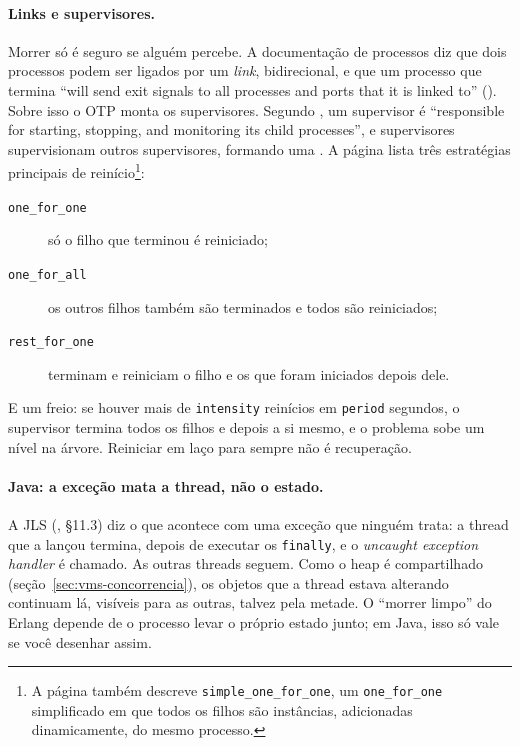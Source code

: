 \paragraph{Links e supervisores.}
Morrer só é seguro se alguém percebe. A documentação de processos diz que
dois processos podem ser ligados por um \emph{link}, bidirecional, e que
um processo que termina \enquote{will send exit signals to all processes
and ports that it is linked to} (). Sobre
isso o OTP monta os supervisores. Segundo ,
um supervisor é \enquote{responsible for starting, stopping, and
monitoring its child processes}, e supervisores supervisionam outros
supervisores, formando uma
. A página lista três
estratégias principais de reinício\footnote{A página também descreve
\texttt{simple\_one\_for\_one}, um \texttt{one\_for\_one} simplificado em
que todos os filhos são instâncias, adicionadas dinamicamente, do mesmo
processo.}:
\begin{description}
\item[\texttt{one\_for\_one}] só o filho que terminou é reiniciado;
\item[\texttt{one\_for\_all}] os outros filhos também são terminados e
  todos são reiniciados;
\item[\texttt{rest\_for\_one}] terminam e reiniciam o filho e os que
  foram iniciados depois dele.
\end{description}
E um freio: se houver mais de \texttt{intensity} reinícios em
\texttt{period} segundos, o supervisor termina todos os filhos e depois a
si mesmo, e o problema sobe um nível na árvore. Reiniciar em laço para
sempre não é recuperação.

\paragraph{Java: a exceção mata a thread, não o estado.}
A JLS (, §11.3) diz o que acontece com uma exceção
que ninguém trata: a thread que a lançou termina, depois de executar os
\texttt{finally}, e o \emph{uncaught exception handler} é chamado. As
outras threads seguem. Como o heap é compartilhado
(seção~\ref{sec:vms-concorrencia}), os objetos que a thread estava
alterando continuam lá, visíveis para as outras, talvez pela metade. O
\enquote{morrer limpo} do Erlang depende de o processo levar o próprio
estado junto; em Java, isso só vale se você desenhar assim.

